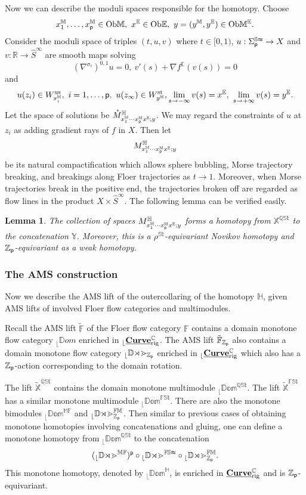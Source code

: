 \documentclass[reqno, 10pt]{amsart}
\numberwithin{equation}{section}
\numberwithin{equation}{section}
\newtheorem{lemma}[thm]{Lemma}
\theoremstyle{definition}
\theoremstyle{remark}
\newcommand{\beqn}{\begin{equation*}}
\newcommand{\eeqn}{\end{equation*}}
\newcommand{\mb}{\mathbb}
\newcommand{\p}{{\sf p}}
\newcommand{\zp}{{{\mb Z}_{\sf p}}}
\newcommand{\ep}{{{\mathbb E}}}
\renewcommand{\outer}{{}_{\lfloor}}
\newcommand{\wh}{\widehat}
\newcommand{\uds}[1]{\underline{\smash{#1}}}
\begin{document}
Now we can describe the moduli spaces responsible for the homotopy. Choose
\beqn
x_1^{\mb M}, \ldots, x_\p^{\mb M} \in {\rm Ob}{\mb M},\ x^\ep \in {\rm Ob}\ep,\ y = (y^{\mb M}, y^\ep) \in {\rm Ob} {\mb M}^\ep.
\eeqn
Consider the moduli space of triples $(t, u, v)$ where $t \in [0, 1)$, $u: \Sigma_\p^{\mb{St}} \to X$ and $v: {\mb R} \to \wh S^\infty$ are smooth maps solving
\beqn
(\nabla^{\sigma_t})^{0,1} u = 0,\ v'(s) + \nabla f^\ep (v(s)) = 0
\eeqn
and 
\beqn
u(z_i) \in W^{\rm us}_{x_i^{\mb M}},\ i = 1, \ldots, \p,\ u(z_\infty) \in W^{\rm st}_{y^{\mb M}}, \lim_{s \to -\infty} v(s) = x^{\ep},\ \lim_{s \to +\infty} v(s) = y^\ep.
\eeqn
Let the space of solutions be $\mathring M_{x_1^{\mb M}\cdots x_\p^{\mb M} x^\ep; y}^{{\mb H}}$. We may regard the constraints of $u$ at $z_i$ as adding gradient rays of $f$ in $X$. Then let
\beqn
M_{x_1^{\mb M}\cdots x_\p^{\mb M} x^\ep; y}^{{\mb H}}
\eeqn
be its natural compactification which allows sphere bubbling, Morse trajectory breaking, and breakings along Floer trajectories as $t \to 1$. Moreover, when Morse trajectories break in the positive end, the trajectories broken off are regarded as flow lines in the product $X \times \wh S^\infty$. The following lemma can be verified easily.

\begin{lemma}
The collection of spaces $M_{x_1^{\mb M}\cdots x_\p^{\mb M} x^\ep; y}^{{\mb H}}$ forms a homotopy from ${\mb X}^{\mb{QSt}}$ to the concatenation ${\mb Y}$. Moreover, this is a $\rho^{\mb{St}}$-equivariant Novikov homotopy and $\zp$-equivariant as a weak homotopy.
\end{lemma}

\subsubsection{The AMS construction}

Now we describe the AMS lift of the outercollaring of the homotopy ${\mb H}$, given AMS lifts of involved Floer flow categories and multimodules. 

Recall the AMS lift $\tilde {\mb F}$ of the Floer flow category ${\mb F}$ contains a domain monotone flow category $\outer {\mb Dom}$ enriched in $\outer \uds{\bf Curve}_{\rm rig}^{\mb{C}}$. The AMS lift $\tilde {\mb F}_{\zp}$ also contains a domain monotone flow category $\outer \mb{Dom}_{\zp}$ enriched in $\outer \uds{\bf Curve}_{\rm rig}^{\mb{C}}$ which also has a $\zp$-action corresponding to the domain rotation. 

The lift $\tilde {\mb X}^{\mb{QSt}}$ contains the domain monotone multimodule $\outer \mb{Dom}^{\mb{QSt}}$. The lift $\tilde {\mb X}^{\mb{FSt}}$ has a similar monotone multimodule $\outer \mb{Dom}^{\mb{FSt}}$. There are also the monotone bimodules $\outer \mb{Dom}^{\mb{MF}}$ and $\outer \mb{Dom}_{\zp}^{\mb{FM}}$. Then similar to previous cases of obtaining monotone homotopies involving concatenations and gluing, one can define a monotone homotopy from $\outer \mb{Dom}^{\mb{QSt}}$ to the concatenation
\beqn
(\outer \mb{Dom}^{\mb{MF}})^{\p} \circ \outer \mb{Dom}^{\mb{FSt}} \circ \outer \mb{Dom}_\zp^{\mb{FM}}.
\eeqn
This monotone homotopy, denoted by $\outer \mb{Dom}^{\mb H}$, is enriched in $\uds{\bf Curve}_{\rm rig}^{\mb{C}}$ and is $\zp$-equivariant. 
\end{document}
